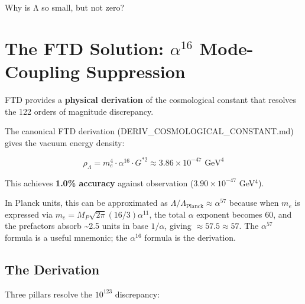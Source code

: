 \documentclass[
  11pt,
  letterpaper,
  twoside,
  openright]{book}
\begin{document}
Why is Λ so small, but not zero?

\section{\texorpdfstring{The FTD Solution: \(\alpha^{16}\) Mode-Coupling
Suppression}{The FTD Solution: \textbackslash alpha\^{}\{16\} Mode-Coupling Suppression}}\label{the-ftd-solution-alpha16-mode-coupling-suppression}

FTD provides a \textbf{physical derivation} of the cosmological constant
that resolves the 122 orders of magnitude discrepancy.

\begin{tcolorbox}[enhanced jigsaw, leftrule=.75mm, title=\textcolor{quarto-callout-important-color}{\faExclamation}\hspace{0.5em}{Precise Formula vs.~Logarithmic Approximation}, bottomrule=.15mm, opacityback=0, coltitle=black, arc=.35mm, colframe=quarto-callout-important-color-frame, colbacktitle=quarto-callout-important-color!10!white, colback=white, titlerule=0mm, breakable, bottomtitle=1mm, toptitle=1mm, rightrule=.15mm, toprule=.15mm, left=2mm, opacitybacktitle=0.6]

The canonical FTD derivation (DERIV\_COSMOLOGICAL\_CONSTANT.md) gives
the vacuum energy density:

\[\rho_\Lambda = m_e^4 \cdot \alpha^{16} \cdot G^{*2} \approx 3.86 \times 10^{-47} \text{ GeV}^4\]

This achieves \textbf{1.0\% accuracy} against observation
(\(3.90 \times 10^{-47}\) GeV\(^4\)).

In Planck units, this can be approximated as
\(\Lambda / \Lambda_{\text{Planck}} \approx \alpha^{57}\) because when
\(m_e\) is expressed via \(m_e = M_P \sqrt{2\pi} (16/3) \alpha^{11}\),
the total \(\alpha\) exponent becomes 60, and the prefactors absorb
\textasciitilde2.5 units in base \(1/\alpha\), giving
\(\approx 57.5 \approx 57\). The \(\alpha^{57}\) formula is a useful
mnemonic; the \(\alpha^{16}\) formula is the derivation.

\end{tcolorbox}

\subsection{The Derivation}\label{the-derivation}

Three pillars resolve the \(10^{123}\) discrepancy:
\end{document}
